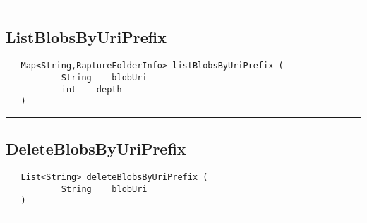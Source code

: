 \rule{15cm}{2pt}
\subsection{ListBlobsByUriPrefix}
\label{Api:ListBlobsByUriPrefix}
\begin{verbatim}
   Map<String,RaptureFolderInfo> listBlobsByUriPrefix (
           String    blobUri
           int    depth
   )
\end{verbatim}



\rule{15cm}{2pt}
\subsection{DeleteBlobsByUriPrefix}
\label{Api:DeleteBlobsByUriPrefix}
\begin{verbatim}
   List<String> deleteBlobsByUriPrefix (
           String    blobUri
   )
\end{verbatim}



\rule{15cm}{2pt}
